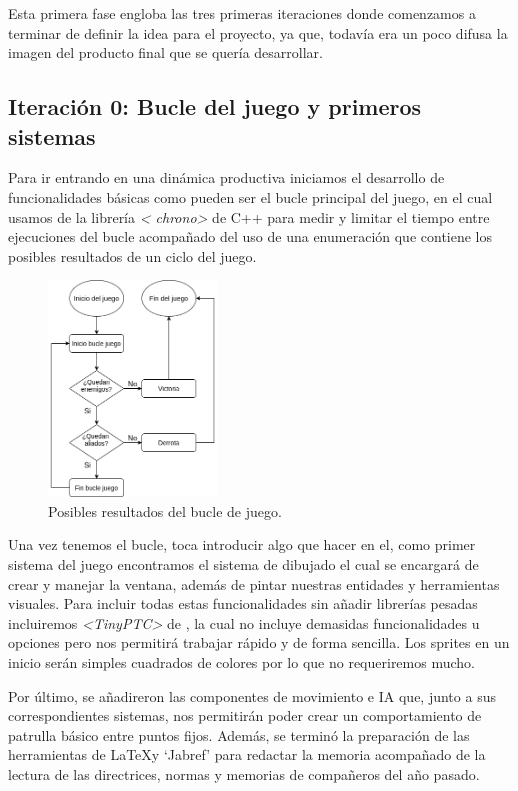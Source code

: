Esta primera fase engloba las tres primeras iteraciones donde comenzamos a terminar de definir 
la idea para el proyecto, ya que, todavía era un poco difusa la imagen del producto final que se
quería desarrollar.

\subsection*{Iteración 0: Bucle del juego y primeros sistemas}
Para ir entrando en una dinámica productiva iniciamos el desarrollo de funcionalidades básicas 
como pueden ser el bucle principal del juego, en el cual usamos de la librería \textit{\textless
chrono\textgreater} de C++ para medir y limitar el tiempo entre ejecuciones del bucle acompañado del uso 
de una enumeración que contiene los posibles resultados de un ciclo del juego.

\begin{figure}[htb]
\centering
\includegraphics[width=0.4\textwidth]{imagenes/diario_desarrollo/Loop_juego.png}
\caption{Posibles resultados del bucle de juego.}
\label{fig:game_loop}
\end{figure} 

Una vez tenemos el bucle, toca introducir algo que hacer en el, como primer sistema del juego
encontramos el sistema de dibujado el cual se encargará de crear y manejar la ventana, además
de pintar nuestras entidades y herramientas visuales. Para incluir todas estas funcionalidades
sin añadir librerías pesadas incluiremos \textit{\textless TinyPTC\textgreater} de \newline
\citeauthor*{tinyptc2019}, la cual no 
incluye demasidas funcionalidades u opciones pero nos permitirá trabajar rápido y de forma 
sencilla. Los sprites en un inicio serán simples cuadrados de colores por lo que no requeriremos 
mucho.

Por último, se añadireron las componentes de movimiento e \ac{IA} que, junto a sus correspondientes
sistemas, nos permitirán poder crear un comportamiento de patrulla básico entre puntos fijos.
Además, se terminó la preparación de las herramientas de \LaTeX y `Jabref' para redactar la 
memoria acompañado de la lectura de las directrices, normas y memorias de compañeros del año 
pasado.

